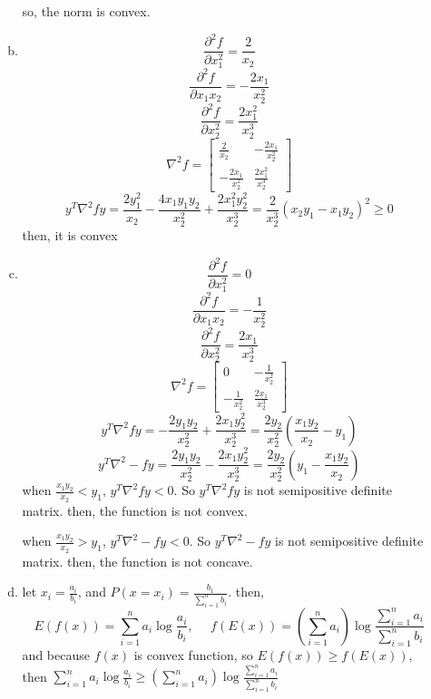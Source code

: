 \documentclass[10pt]{article}
\begin{document}
\begin{enumerate}[1.]
\begin{enumerate}[(a)]
			so, the norm is convex.
			\item 
			$$\frac{\partial^2 f}{\partial x_1^2}=\frac{2}{x_2}$$
			$$\frac{\partial^2 f}{\partial x_1x_2}=-\frac{2x_1}{x_2^2}$$
			$$\frac{\partial^2 f}{\partial x_2^2}=\frac{2x_1^2}{x_2^3}$$
			$$\nabla^2f=\begin{bmatrix}
				\frac{2}{x_2}&-\frac{2x_1}{x_2^2}\\-\frac{2x_1}{x_2^2}&\frac{2x_1^2}{x_2^3}
			\end{bmatrix}$$
			$$y^T\nabla^2fy=\frac{2y_1^2}{x_2}-\frac{4x_1y_1y_2}{x_2^2}+\frac{2x_1^2y_2^2}{x_2^3}=\frac{2}{x_2^3}(x_2y_1-x_1y_2)^2\geq0$$
			then, it is convex
			\item 
			$$\frac{\partial^2 f}{\partial x_1^2}=0$$
			$$\frac{\partial^2 f}{\partial x_1x_2}=-\frac{1}{x_2^2}$$
			$$\frac{\partial^2 f}{\partial x_2^2}=\frac{2x_1}{x_2^3}$$
			$$\nabla^2f=\begin{bmatrix}
				0&-\frac{1}{x_2^2}\\-\frac{1}{x_2^2}&\frac{2x_1}{x_2^3}
			\end{bmatrix}$$
			$$y^T\nabla^2fy=-\frac{2y_1y_2}{x_2^2}+\frac{2x_1y_2^2}{x_2^3}=\frac{2y_2}{x_2^2}(\frac{x_1y_2}{x_2}-y_1)$$
			$$y^T\nabla^2-fy=\frac{2y_1y_2}{x_2^2}-\frac{2x_1y_2^2}{x_2^3}=\frac{2y_2}{x_2^2}(y_1-\frac{x_1y_2}{x_2})$$
			when $\frac{x_1y_2}{x_2}<y_1$, $y^T\nabla^2fy<0$. So $y^T\nabla^2fy$ is not semipositive definite matrix. then, the function is not convex.
			
			when $\frac{x_1y_2}{x_2}>y_1$, $y^T\nabla^2-fy<0$. So $y^T\nabla^2-fy$ is not semipositive definite matrix. then, the function is not concave.
			\item
			let $x_i=\frac{a_i}{b_i}$, and $P(x=x_i)=\frac{b_1}{\sum_{i=1}^nb_i}$.
			then, $$E(f(x))=\sum_{i=1}^na_i\log\frac{a_i}{b_i},\ \ \ \ \ \ f(E(x))=(\sum_{i=1}^na_i)\log\frac{\sum_{i=1}^na_i}{\sum_{i=1}^nb_i}$$
			and because $f(x)$ is convex function, so $E(f(x))\geq f(E(x))$, then $\sum_{i=1}^{n} a_i \log \frac{a_i}{b_i} \geq \left( \sum_{i=1}^{n} a_i\right) \log \frac{\sum_{i=1}^{n} a_i}{\sum_{i=1}^{n} b_i}$
		  \end{enumerate}

	      \newpage


\end{enumerate}
\end{document}
